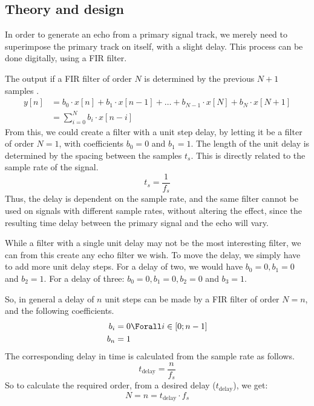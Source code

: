 
\subsection{Theory and design}
In order to generate an echo from a primary signal track, we merely need to superimpose the primary track on itself, with a slight delay. This process can be done digitally, using a FIR filter.

The output if a FIR filter of order $N$ is determined by the previous $N + 1$ samples .
\begin{align}
y[n] & = b_{0} \cdot x[n] + b_{1} \cdot x[n - 1] + \dots + b_{N - 1} \cdot x[N] + b_{N} \cdot x[N + 1] \nonumber \\
& = \sum_{i = 0}^{N} b_{i} \cdot x[n - i]
\end{align}
From this, we could create a filter with a unit step delay, by letting it be a filter of order $N = 1$, with coefficients $b_{0} = 0$ and $b_{1} = 1$. The length of the unit delay is determined by the spacing between the samples $t_{s}$. This is directly related to the sample rate of the signal.
\begin{equation}
t_{s} = \frac{1}{f_{s}}
\end{equation}
Thus, the delay is dependent on the sample rate, and the same filter cannot be used on signals with different sample rates, without altering the effect, since the resulting time delay between the primary signal and the echo will vary.

While a filter with a single unit delay may not be the most interesting filter, we can from this create any echo filter we wish. To move the delay, we simply have to add more unit delay steps. For a delay of two, we would have $b_{0} = 0, b_{1} = 0$ and $b_{2} = 1$. For a delay of three: $b_{0} = 0, b_{1} = 0, b_{2} = 0$ and $b_{3} = 1$.

So, in general a delay of $n$ unit steps can be made by a FIR filter of order $N = n$, and the following coefficients.
\begin{align}
b_{i} & = 0 \Forall i \in [0; n - 1] \nonumber \\
b_{n} & = 1
\label{eqn:echocoeff}
\end{align}
The corresponding delay in time is calculated from the sample rate as follows.
\begin{equation}
t_{\textrm{delay}} = \frac{n}{f_{s}}
\end{equation}
So to calculate the required order, from a desired delay ($t_{\textrm{delay}}$), we get:
\begin{equation}
N = n = t_{\textrm{delay}} \cdot f_{s}
\end{equation}
